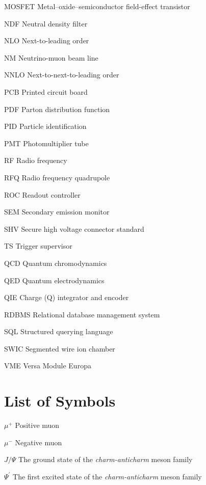 \documentclass[edeposit,fullpage]{uiucthesis2009}
\begin{document}
\begin{symbollist*}
	\item[MOSFET] Metal–oxide–semiconductor field-effect transistor
	\item[NDF] Neutral density filter
	\item[NLO] Next-to-leading order
	\item[NM] Neutrino-muon beam line
	\item[NNLO] Next-to-next-to-leading order
	\item[PCB] Printed circuit board
	\item[PDF] Parton distribution function
	\item[PID] Particle identification
	\item[PMT] Photomultiplier tube
	\item[RF] Radio frequency
	\item[RFQ] Radio frequency quadrupole
	\item[ROC] Readout controller
	\item[SEM] Secondary emission monitor
	\item[SHV] Secure high voltage connector standard
	\item[TS] Trigger supervisor
	\item[QCD] Quantum chromodynamics
	\item[QED] Quantum electrodynamics
	\item[QIE] Charge (Q) integrator and encoder
	\item[RDBMS] Relational database management system
	\item[SQL] Structured querying language
	\item[SWIC] Segmented wire ion chamber
	\item[VME] Versa Module Europa
\end{symbollist*}

\chapter{List of Symbols}

\begin{symbollist}[0.7in]
\item[$\mu^+$] Positive muon
\item[$\mu^-$] Negative muon
\item[$J/\Psi$] The ground state of the \emph{charm-anticharm} meson family
\item[$\Psi^\prime$] The first excited state of the \emph{charm-anticharm} meson family
\end{symbollist}

\mainmatter

%


%
%
%
%
%

\appendix



\backmatter



\end{document}
